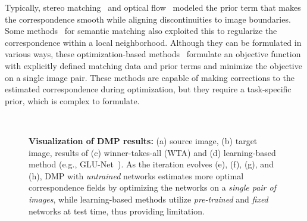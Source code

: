 \documentclass[10pt,twocolumn,letterpaper]{article}
\begin{document}
Typically, stereo matching~\cite{kendall2017end,chang2018pyramid} and optical flow~\cite{ilg2017flownet,sun2018pwc} modeled the prior term that makes the correspondence smooth while aligning discontinuities to image boundaries. Some methods~\cite{liu2010sift,taniai2016joint,ham2016proposal,kim2017dctm} for semantic matching also exploited this to regularize the correspondence within a local neighborhood. Although they can be formulated in various ways, these optimization-based methods~\cite{liu2010sift,taniai2016joint,ham2016proposal,kim2017dctm} formulate an objective function with explicitly defined matching data and prior terms and minimize the objective on a single image pair. These methods are capable of making corrections to the estimated correspondence during optimization, but they require a task-specific prior, which is complex to formulate.   

\begin{figure}
    \centering
    \renewcommand{\thesubfigure}{}
    \hfill
    \hfill
    \hfill
    \hfill\\
    \vspace{-5pt}
    \hfill
    \hfill
    \hfill
    \hfill
    \caption{\textbf{Visualization of DMP results:} (a) source image, (b) target image, results of 
    (c) winner-takes-all (WTA) and (d) learning-based method (e.g., GLU-Net~\cite{truong2020glu}). As the iteration evolves (e), (f), (g), and (h), DMP with \emph{untrained} networks estimates more optimal correspondence fields by optimizing the networks on a \emph{single pair of images}, while learning-based methods utilize \emph{pre-trained} and \emph{fixed} networks at test time, thus providing limitation.}\label{img:1}\vspace{-10pt}
\end{figure}
\end{document}
